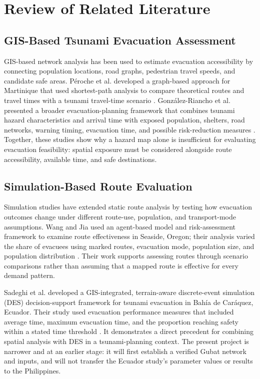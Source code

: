 \documentclass[conference]{IEEEtran}
\begin{document}
\section{Review of Related Literature}

\subsection{GIS-Based Tsunami Evacuation Assessment}

GIS-based network analysis has been used to estimate evacuation accessibility by connecting population locations, road graphs, pedestrian travel speeds, and candidate safe areas. P\'eroche et al. developed a graph-based approach for Martinique that used shortest-path analysis to compare theoretical routes and travel times with a tsunami travel-time scenario \cite{peroche}. Gonz\'alez-Riancho et al. presented a broader evacuation-planning framework that combines tsunami hazard characteristics and arrival time with exposed population, shelters, road networks, warning timing, evacuation time, and possible risk-reduction measures \cite{gonzalez}. Together, these studies show why a hazard map alone is insufficient for evaluating evacuation feasibility: spatial exposure must be considered alongside route accessibility, available time, and safe destinations.

\subsection{Simulation-Based Route Evaluation}

Simulation studies have extended static route analysis by testing how evacuation outcomes change under different route-use, population, and transport-mode assumptions. Wang and Jia used an agent-based model and risk-assessment framework to examine route effectiveness in Seaside, Oregon; their analysis varied the share of evacuees using marked routes, evacuation mode, population size, and population distribution \cite{wangjia}. Their work supports assessing routes through scenario comparisons rather than assuming that a mapped route is effective for every demand pattern.

Sadeghi et al. developed a GIS-integrated, terrain-aware discrete-event simulation (DES) decision-support framework for tsunami evacuation in Bah\'ia de Car\'aquez, Ecuador. Their study used evacuation performance measures that included average time, maximum evacuation time, and the proportion reaching safety within a stated time threshold \cite{sadeghi}. It demonstrates a direct precedent for combining spatial analysis with DES in a tsunami-planning context. The present project is narrower and at an earlier stage: it will first establish a verified Gubat network and inputs, and will not transfer the Ecuador study's parameter values or results to the Philippines.
\end{document}
